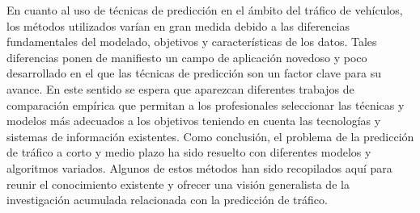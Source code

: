 \documentclass{llncs}
\begin{document}
En cuanto al uso de técnicas de predicción en el ámbito del tráfico de vehículos, los métodos utilizados varían en gran medida debido a las diferencias fundamentales del modelado, objetivos y características de los datos. Tales diferencias ponen de manifiesto un campo de aplicación novedoso y poco desarrollado en el que las técnicas de predicción son un factor clave para su avance. En este sentido se espera que aparezcan diferentes trabajos de comparación empírica que permitan a los profesionales seleccionar las técnicas y modelos más adecuados a los objetivos teniendo en cuenta las tecnologías y sistemas de información existentes. Como conclusión, el problema de la predicción de tráfico a corto y medio plazo ha sido resuelto con diferentes modelos y algoritmos variados. Algunos de estos métodos han sido recopilados aquí para reunir el conocimiento existente y ofrecer una visión generalista de la investigación acumulada relacionada con la predicción de tráfico.





\end{document}

